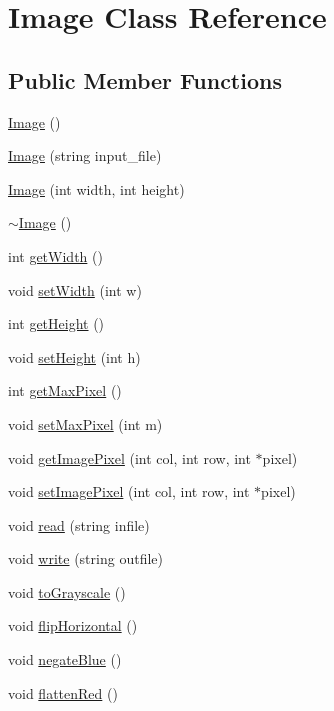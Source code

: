 \hypertarget{class_image}{}\section{Image Class Reference}
\label{class_image}
\subsection*{Public Member Functions}
\begin{DoxyCompactItemize}
\item 
\hyperlink{class_image_a58edd1c45b4faeb5f789b0d036d02313}{Image} ()
\item 
\hyperlink{class_image_af2d2b2b46060ce7d4dda966d1bb29b45}{Image} (string input\+\_\+file)
\item 
\hyperlink{class_image_afb0339b802ed560e69eb07358d30198f}{Image} (int width, int height)
\item 
\hyperlink{class_image_a0294f63700543e11c0f0da85601c7ae5}{$\sim$\+Image} ()
\item 
int \hyperlink{class_image_af2720a072812763395512fc3c8c21362}{get\+Width} ()
\item 
void \hyperlink{class_image_a385abd0ecca8787fe15d9a72ac60001a}{set\+Width} (int w)
\item 
int \hyperlink{class_image_aa4e1f064e5e1f3f04ad605408f1ec3af}{get\+Height} ()
\item 
void \hyperlink{class_image_a6e15783dcc55c301f4e887e27a7c38be}{set\+Height} (int h)
\item 
int \hyperlink{class_image_a4fc6fccb6a5cdb33dd2ee14d6d785075}{get\+Max\+Pixel} ()
\item 
void \hyperlink{class_image_a726a71590bc574158cb5d4994c4b12d1}{set\+Max\+Pixel} (int m)
\item 
void \hyperlink{class_image_a06bf6921136ef94ef30a788dbf609ce9}{get\+Image\+Pixel} (int col, int row, int $\ast$pixel)
\item 
void \hyperlink{class_image_a44556ed55401215428fbaae43256315c}{set\+Image\+Pixel} (int col, int row, int $\ast$pixel)
\item 
void \hyperlink{class_image_afd7841c2016dc76156a43cc4cd348680}{read} (string infile)
\item 
void \hyperlink{class_image_addd74434babf60a45c1d7b9fc155723a}{write} (string outfile)
\item 
void \hyperlink{class_image_ad6a65050729083c4e64c2a1cb4f5ee41}{to\+Grayscale} ()
\item 
void \hyperlink{class_image_a82d860b94ad3e5250fb077e063ce3fa6}{flip\+Horizontal} ()
\item 
void \hyperlink{class_image_a47f12bc0bd85a51e20cd12a514a9411a}{negate\+Blue} ()
\item 
void \hyperlink{class_image_a95fc031a2d406d17d6b4dadff743cf7c}{flatten\+Red} ()
\end{DoxyCompactItemize}


